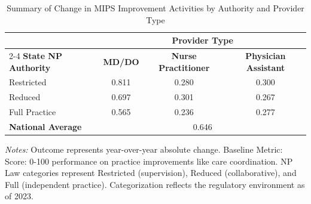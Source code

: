 \begin{table}[htbp]
    \centering
    \caption{Summary of Change in MIPS Improvement Activities by Authority and Provider Type}
    \label{tab:d_mips_ia_score_provtype}
    \vspace{0.2cm}
    \begin{tabular}{lccc}
        \toprule
        & \multicolumn{3}{c}{\textbf{Provider Type}} \\
        \cmidrule(lr){2-4}
        \textbf{State NP Authority} & \textbf{MD/DO} & \textbf{Nurse Practitioner} & \textbf{Physician Assistant} \\
        \midrule
        Restricted & 0.811 & 0.280 & 0.300 \\
        Reduced & 0.697 & 0.301 & 0.267 \\
        Full Practice & 0.565 & 0.236 & 0.277 \\
        \midrule
        \textbf{National Average} & \multicolumn{3}{c}{0.646} \\
        \bottomrule
    \end{tabular}
    \vspace{0.1cm}
    \begin{minipage}{0.85\textwidth}
        \footnotesize \textit{Notes:} Outcome represents year-over-year absolute change. Baseline Metric: Score: 0-100 performance on practice improvements like care coordination. NP Law categories represent Restricted (supervision), Reduced (collaborative), and Full (independent practice). Categorization reflects the regulatory environment as of 2023.
    \end{minipage}
\end{table}
